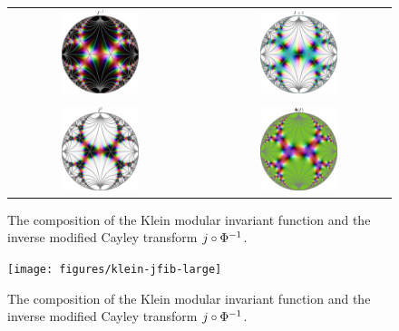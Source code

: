 \begin{figure}
\centering
\begin{tabular}{c c c}
\includegraphics[width=0.45\textwidth]{figures/klein-jinv} & \quad &
\includegraphics[width=0.45\textwidth]{figures/klein-jm1} \\
\\
\includegraphics[width=0.45\textwidth]{figures/klein-jsqr} & \quad &
\includegraphics[width=0.45\textwidth]{figures/klein-j-mod-cayley}
\end{tabular}
\caption{The composition of the Klein modular invariant function and the inverse modified Cayley transform $j \circ {\Phi}^{-1}$.}
\label{fig_FunctionsOfJ}
\end{figure}

\begin{figure}
\centering
\texttt{[image: figures/klein-jfib-large]}
\caption{The composition of the Klein modular invariant function and the inverse modified Cayley transform $j \circ {\Phi}^{-1}$.}
\label{fig_KleinJFib}
\end{figure}
